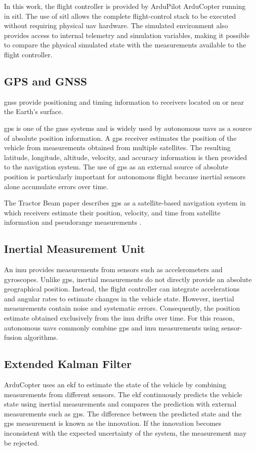 In this work, the flight controller is provided by ArduPilot ArduCopter running in \gls{sitl}.
The use of \gls{sitl} allows the complete flight-control stack to be executed without requiring physical \gls{uav} hardware.
The simulated environment also provides access to internal telemetry and simulation variables, making it possible to compare the physical simulated state with the measurements available to the flight controller. 

\subsection{GPS and GNSS}
\gls{gnss} provide positioning and timing information to receivers located on or near the Earth's surface.

\gls{gps} is one of the \gls{gnss} systems and is widely used by autonomous \glspl{uav} as a source of absolute position information.
A \gls{gps} receiver estimates the position of the vehicle from measurements obtained from multiple satellites.
The resulting latitude, longitude, altitude, velocity, and accuracy information is then provided to the navigation system.
The use of \gls{gps} as an external source of absolute position is particularly important for autonomous flight because inertial sensors alone accumulate errors over time.

The Tractor Beam paper describes \gls{gps} as a satellite-based navigation system in which receivers estimate their position, velocity, and time from satellite information and pseudorange measurements \cite{noh2019tractorbeam}. 

\subsection{Inertial Measurement Unit}
An \gls{imu} provides measurements from sensors such as accelerometers and gyroscopes.
Unlike \gls{gps}, inertial measurements do not directly provide an absolute geographical position.
Instead, the flight controller can integrate accelerations and angular rates to estimate changes in the vehicle state.
However, inertial measurements contain noise and systematic errors.
Consequently, the position estimate obtained exclusively from the \gls{imu} drifts over time.
For this reason, autonomous \glspl{uav} commonly combine \gls{gps} and \gls{imu} measurements using sensor-fusion algorithms.

\subsection{Extended Kalman Filter}
ArduCopter uses an \gls{ekf} to estimate the state of the vehicle by combining measurements from different sensors.
The \gls{ekf} continuously predicts the vehicle state using inertial measurements and compares the prediction with external measurements such as \gls{gps}.
The difference between the predicted state and the \gls{gps} measurement is known as the innovation.
If the innovation becomes inconsistent with the expected uncertainty of the system, the measurement may be rejected.

